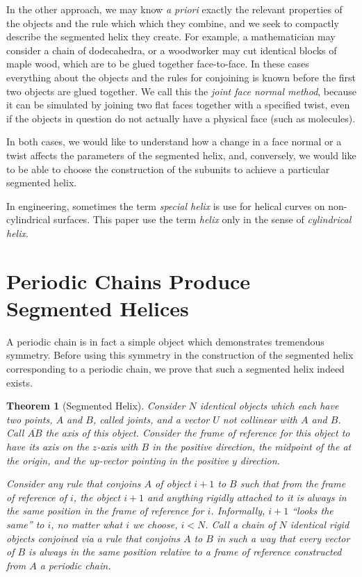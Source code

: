 \documentclass[11pt]{article}
\newtheorem{theorem}{Theorem}
\begin{document}
{In the other approach, we may know {\it a priori} exactly the
relevant properties of the objects and the rule which which they combine, and we seek to compactly describe the segmented helix they create.
For example, a mathematician may consider a chain of dodecahedra, or a woodworker may cut identical blocks of maple wood,
which are to be glued together face-to-face. In these cases everything about the objects and the rules for conjoining
is known before the first two objects are glued together. We call this the {\em joint face normal method}, because
it can be simulated by joining two flat faces together with a specified twist, even if the objects in question
do not actually have a physical face (such as molecules).

In both cases, we would like to understand how a change in a face normal or a twist affects the parameters of the segmented helix,
and, conversely, we would like to be able to choose the construction of the subunits to achieve a particular segmented helix.

In engineering, sometimes the term {\em special helix}\cite{gu2012research} is use for helical curves on non-cylindrical surfaces. This paper use the term {\em helix} only in the sense of {\em cylindrical helix}.

\section{Periodic Chains Produce Segmented Helices}

A periodic chain is in fact a simple object which demonstrates tremendous symmetry.
Before using this symmetry in the construction of the segmented helix corresponding to a periodic chain, we
prove that such a segmented helix indeed exists.

\begin{theorem}[Segmented Helix]
  Consider $N$ identical objects which each have two points, $A$ and $B$, called {\em joints},
  and a vector $U$ not collinear with $A$ and $B$. Call
  $\overline{AB}$ the {\em axis} of this object.
  Consider the frame of reference for this object to have
  its axis on the $z$-axis with $B$ in the positive direction, the
  midpoint of the at the origin, and the up-vector pointing in the positive $y$ direction.

  Consider any rule that conjoins $A$ of object $i+1$ to $B$ such that
  from the frame of reference of $i$, the object $i+1$ and anything rigidly
  attached to it is always in the same position in the frame of reference for $i$.
  Informally, $i+1$ ``looks the same'' to $i$, no matter what $i$ we choose, $i < N$.
  Call a chain of $N$ identical rigid objects conjoined via a rule that
  conjoins $A$ to $B$ in such a way that every vector
  of $B$ is always in the same position relative to a frame of reference
  constructed from $A$ a {\em periodic chain.}


\end{theorem}}
\end{document}

